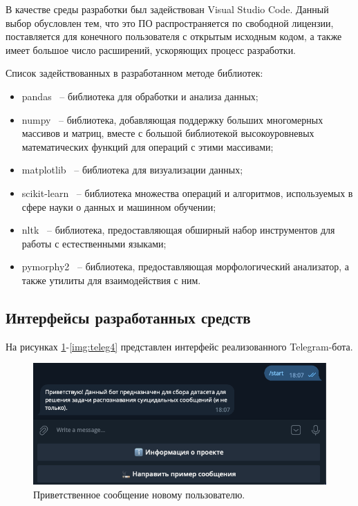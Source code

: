 В качестве среды разработки был задействован Visual Studio Code. Данный выбор обусловлен тем, что это ПО распространяется по свободной лицензии, поставляется для конечного пользователя с открытым исходным кодом, а также имеет большое число расширений, ускоряющих процесс разработки.

Список задействованных в разработанном методе библиотек:
\begin{itemize}
	\item pandas~\cite{pandas} -- библиотека для обработки и анализа данных;
	\item numpy~\cite{numpy} -- библиотека, добавляющая поддержку больших многомерных массивов и матриц, вместе с большой библиотекой высокоуровневых математических функций для операций с этими массивами;
	\item matplotlib~\cite{matplotlib} -- библиотека для визуализации данных;
	\item scikit-learn~\cite{sklearn} -- библиотека множества операций и алгоритмов, используемых в сфере науки о данных и машинном обучении;
	\item nltk~\cite{nltk} -- библиотека, предоставляющая обширный набор инструментов для работы с естественными языками;
	\item pymorphy2~\cite{pymorphy} -- библиотека, предоставляющая морфологический анализатор, а также утилиты для взаимодействия с ним.
\end{itemize}

\subsection{Интерфейсы разработанных средств}

На рисунках \ref{img:teleg1}-\ref{img:teleg4} представлен интерфейс реализованного Telegram-бота.

\begin{figure}[H]
	\centering
	\includegraphics[width=\textwidth]{inc/teleg1.png}
	\caption{ Приветственное сообщение новому пользователю. }
	\label{img:teleg1}
\end{figure}

